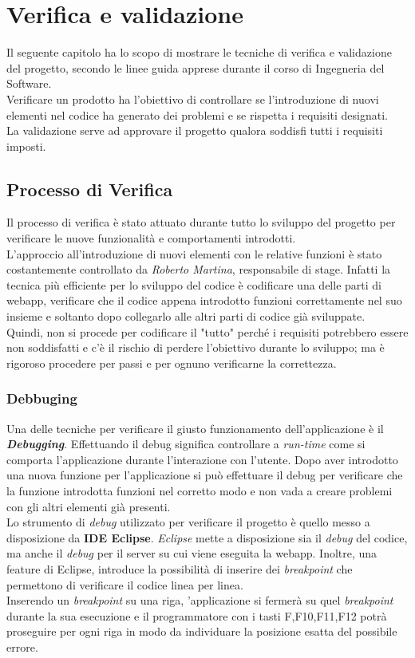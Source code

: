 \chapter{Verifica e validazione}
\label{cap:verifica-validazione}

Il seguente capitolo ha lo scopo di mostrare le tecniche di verifica e validazione del progetto, secondo le linee guida apprese durante il corso di Ingegneria del Software. \\
Verificare un prodotto ha l'obiettivo di controllare se l'introduzione di nuovi elementi nel codice ha generato dei problemi e se rispetta i requisiti designati. 
\\La validazione serve ad approvare il progetto qualora soddisfi tutti i requisiti imposti.

\section{Processo di Verifica}
Il processo di verifica è stato attuato durante tutto lo sviluppo del progetto per verificare le nuove funzionalità e comportamenti introdotti.\\
L'approccio all'introduzione di nuovi elementi con le relative funzioni è stato costantemente controllato da \textit{Roberto Martina}, responsabile di stage. Infatti  la tecnica più efficiente per lo sviluppo del codice è codificare una delle parti di webapp, verificare che il codice appena introdotto funzioni correttamente nel suo insieme e soltanto dopo collegarlo alle altri parti di codice già sviluppate.\\
Quindi, non si procede per codificare il "tutto" perché i requisiti potrebbero essere non soddisfatti e c'è il rischio di perdere l'obiettivo durante lo sviluppo; ma è rigoroso procedere per passi e per ognuno verificarne la correttezza.

\subsection{Debbuging}
Una delle tecniche per verificare il giusto funzionamento dell'applicazione è il \textit{\textbf{Debugging}}. Effettuando il debug significa controllare a \textit{run-time} come si comporta l'applicazione durante l'interazione con l'utente. Dopo aver introdotto una nuova funzione per l'applicazione si può effettuare il debug per verificare che la funzione introdotta funzioni nel corretto modo e non vada a creare problemi con gli altri elementi già presenti. \\
Lo strumento di \textit{debug} utilizzato per verificare il progetto è quello messo a disposizione da \textbf{IDE Eclipse}. \textit{Eclipse} mette a disposizione sia il \textit{debug} del codice, ma anche il \textit{debug} per il server su cui viene eseguita la webapp.
Inoltre, una feature di Eclipse, introduce la possibilità di inserire dei \textit{breakpoint} che permettono di verificare il codice linea per linea.\\ Inserendo un \textit{breakpoint} su una riga, 'applicazione si fermerà su quel \textit{breakpoint} durante la sua esecuzione e il programmatore con i tasti F,F10,F11,F12 potrà proseguire per ogni riga in modo da individuare la posizione esatta del possibile errore.

